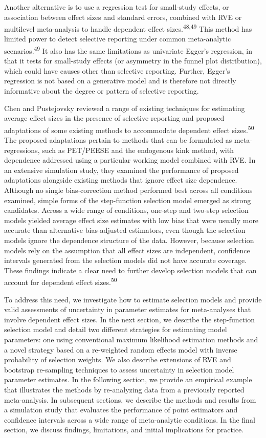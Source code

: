 \documentclass[
  american,
  man, donotrepeattitle,floatsintext]{apa7}
\begin{document}
Another alternative is to use a regression test for small-study effects, or association between effect sizes and standard errors, combined with RVE or multilevel meta-analysis to handle dependent effect sizes.\textsuperscript{48,49}
This method has limited power to detect selective reporting under common meta-analytic scenarios.\textsuperscript{49}
It also has the same limitations as univariate Egger's regression, in that it tests for small-study effects (or asymmetry in the funnel plot distribution), which could have causes other than selective reporting.
Further, Egger's regression is not based on a generative model and is therefore not directly informative about the degree or pattern of selective reporting.

Chen and Pustejovsky reviewed a range of existing techniques for estimating average effect sizes in the presence of selective reporting and proposed adaptations of some existing methods to accommodate dependent effect sizes.\textsuperscript{50}
The proposed adaptations pertain to methods that can be formulated as meta-regressions, such as PET/PEESE and the endogenous kink method, with dependence addressed using a particular working model combined with RVE.
In an extensive simulation study, they examined the performance of proposed adaptations alongside existing methods that ignore effect size dependence.
Although no single bias-correction method performed best across all conditions examined, simple forms of the step-function selection model emerged as strong candidates.
Across a wide range of conditions, one-step and two-step selection models yielded average effect size estimates with low bias that were usually more accurate than alternative bias-adjusted estimators, even though the selection models ignore the dependence structure of the data.
However, because selection models rely on the assumption that all effect sizes are independent, confidence intervals generated from the selection models did not have accurate coverage.
These findings indicate a clear need to further develop selection models that can account for dependent effect sizes.\textsuperscript{50}

To address this need, we investigate how to estimate selection models and provide valid assessments of uncertainty in parameter estimates for meta-analyses that involve dependent effect sizes.
In the next section, we describe the step-function selection model and detail two different strategies for estimating model parameters: one using conventional maximum likelihood estimation methods and a novel strategy based on a re-weighted random effects model with inverse probability of selection weights.
We also describe extensions of RVE and bootstrap re-sampling techniques to assess uncertainty in selection model parameter estimates.
In the following section, we provide an empirical example that illustrates the methods by re-analyzing data from a previously reported meta-analysis.
In subsequent sections, we describe the methods and results from a simulation study that evaluates the performance of point estimators and confidence intervals across a wide range of meta-analytic conditions.
In the final section, we discuss findings, limitations, and initial implications for practice.
\end{document}
